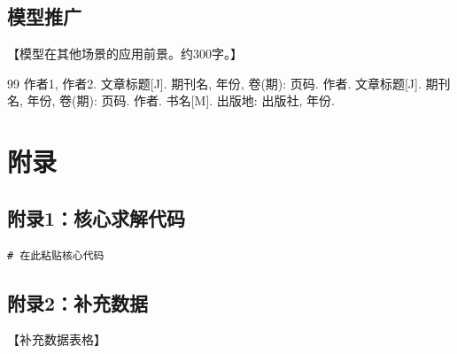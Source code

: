 \documentclass[12pt,a4paper]{ctexart}
\numberwithin{equation}{section}
\numberwithin{figure}{section}
\numberwithin{table}{section}
\begin{document}
\subsection{模型推广}
【模型在其他场景的应用前景。约300字。】

\newpage
\begin{thebibliography}{99}
 作者1, 作者2. 文章标题[J]. 期刊名, 年份, 卷(期): 页码.
 作者. 文章标题[J]. 期刊名, 年份, 卷(期): 页码.
 作者. 书名[M]. 出版地: 出版社, 年份.
\end{thebibliography}

\newpage
\section*{附录}

\subsection*{附录1：核心求解代码}
{\small\ttfamily
\begin{verbatim}
# 在此粘贴核心代码
\end{verbatim}
}

\subsection*{附录2：补充数据}
【补充数据表格】
\end{document}
